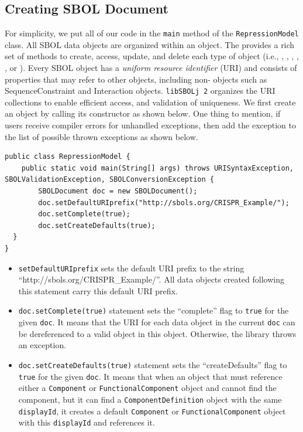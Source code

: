 \subsection*{Creating SBOL Document}
For simplicity, we put all of our code in the \lstinline+main+ method of the \lstinline+RepressionModel+ class. All SBOL data objects are organized within an  object. The  provides a rich set of methods to create, access, update, and delete each type of  object (i.e., , , , , , or ). Every SBOL object has a \emph{uniform resource identifier} (URI) and consists of properties that may refer to other objects, including non- objects such as SequenceConstraint and Interaction objects. \texttt{libSBOLj 2} organizes the URI collections to enable efficient access, and validation of uniqueness. We first create an  object by calling its constructor as shown below. One thing to mention, if users receive compiler errors for unhandled exceptions, then add the exception to the list of possible thrown exceptions as shown below. 

\begin{minipage}{0.95\textwidth} 
\begin{lstlisting}
public class RepressionModel {
	public static void main(String[] args) throws URISyntaxException, SBOLValidationException, SBOLConversionException {
		SBOLDocument doc = new SBOLDocument();
		doc.setDefaultURIprefix("http://sbols.org/CRISPR_Example/");
		doc.setComplete(true);
		doc.setCreateDefaults(true);
  }
}
\end{lstlisting}
\end{minipage}

\begin{itemize}
\item \lstinline+setDefaultURIprefix+ sets the
default URI prefix to the string ``http://sbols.org/CRISPR\_Example/''. All data objects created following this statement carry this default URI prefix.
\item \lstinline+doc.setComplete(true)+ statement sets the ``complete'' flag to \lstinline+true+ for the given \lstinline+doc+. It means that the URI for each data object in the current \lstinline+doc+ can be dereferenced to a valid object in this  object. Otherwise, the library throws an exception. 

\item \lstinline+doc.setCreateDefaults(true)+ statement
sets the ``createDefaults'' flag to \lstinline+true+ for the given
\lstinline+doc+.  It means that when an object that must
reference either a \lstinline+Component+ or \lstinline+FunctionalComponent+ object and cannot find the component, but it can find a \lstinline+ComponentDefinition+ object
with the same \lstinline+displayId+, it creates a default \lstinline+Component+ or \lstinline+FunctionalComponent+ object with this \lstinline+displayId+ and references it.

\end{itemize}

